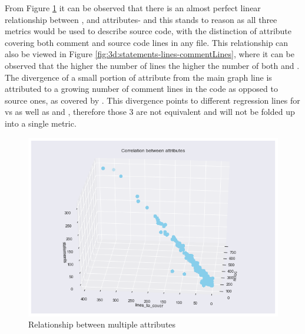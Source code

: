 \begin{enumerate}
From Figure \ref{fig:3d:ncloc-linesToCover-statements} it can be observed that there is an almost perfect linear relationship between \statements{}, \ncloc{} and \lines{} attributes- and this stands to reason as all three metrics would be used to describe source code, with the distinction of \lines{} attribute covering both comment and source code lines in any file. This relationship can also be viewed in Figure \ref{fig:3d:statements-lines-commentLines}, where it can be observed that the higher the number of lines the higher the number of both \statements{} and \commentLines{}. The divergence of a small portion of \lines{} attribute from the main graph line is attributed to a growing number of comment lines in the code as opposed to source ones, as covered by \statements{}. This divergence points to different regression lines for \lines{} vs\commentLines{} as well as \lines{} and \statements{}, therefore those 3 are not equivalent and will not be folded up into a single metric.
\begin{figure}[!h]
    \centering
    \includegraphics[scale=0.65]{Figures/three-d/Correlation-between-attributes-ncloc-lines_to_cover-statements.png}
    \caption{Relationship between multiple attributes}
    \label{fig:3d:ncloc-linesToCover-statements}
\end{figure}


\end{enumerate}
